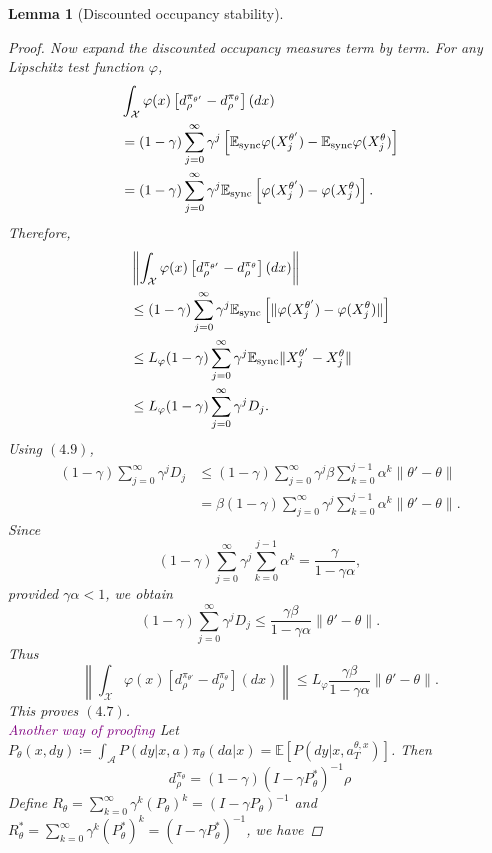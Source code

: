 \documentclass{article}
\newtheorem{lem}[thm]{Lemma}
\theoremstyle{definition}
\theoremstyle{remark}
\theoremstyle{mystyle}
\newcommand{\E}{\mathbb{E}}
\newcommand{\1}{\mathbbm{1}}
\begin{document}
\begin{lem}[Discounted occupancy stability]
\begin{proof}
Now expand the discounted occupancy measures term by term. For any Lipschitz test function \(\varphi\),
\[
\begin{aligned}
&\int_{\mathcal X}\varphi(x)
\left[
d_\rho^{\pi_{\theta'}}-d_\rho^{\pi_\theta}
\right](dx)
\\
&=
(1-\gamma)
\sum_{j=0}^{\infty}
\gamma^j
\left[
\mathbb E_{\rm sync}\varphi(X_j^{\theta'})
-
\mathbb E_{\rm sync}\varphi(X_j^\theta)
\right]
\\
&=
(1-\gamma)
\sum_{j=0}^{\infty}
\gamma^j
\mathbb E_{\rm sync}
\left[
\varphi(X_j^{\theta'})
-
\varphi(X_j^\theta)
\right].
\end{aligned}
\]
Therefore,
\[
\begin{aligned}
&\left\|
\int_{\mathcal X}\varphi(x)
\left[
d_\rho^{\pi_{\theta'}}-d_\rho^{\pi_\theta}
\right](dx)
\right\|
\\
&\le
(1-\gamma)
\sum_{j=0}^{\infty}
\gamma^j
\mathbb E_{\rm sync}
\left[
\|\varphi(X_j^{\theta'})
-
\varphi(X_j^\theta)\|
\right]
\\
&\le
L_\varphi
(1-\gamma)
\sum_{j=0}^{\infty}
\gamma^j
\mathbb E_{\rm sync}
\|X_j^{\theta'}-X_j^\theta\|
\\
&\le
L_\varphi
(1-\gamma)
\sum_{j=0}^{\infty}
\gamma^jD_j.
\end{aligned}
\]
Using \((4.9)\),
\[
\begin{aligned}
(1-\gamma)
\sum_{j=0}^{\infty}
\gamma^jD_j
&\le
(1-\gamma)
\sum_{j=0}^{\infty}
\gamma^j
\beta
\sum_{k=0}^{j-1}\alpha^k
\|\theta'-\theta\|
\\
&=
\beta
(1-\gamma)
\sum_{j=0}^{\infty}
\gamma^j
\sum_{k=0}^{j-1}\alpha^k
\|\theta'-\theta\|.
\end{aligned}
\]
Since
\[
(1-\gamma)
\sum_{j=0}^{\infty}
\gamma^j
\sum_{k=0}^{j-1}\alpha^k
=
\frac{\gamma}{1-\gamma\alpha},
\]
provided \(\gamma\alpha<1\), we obtain
\[
(1-\gamma)
\sum_{j=0}^{\infty}
\gamma^jD_j
\le
\frac{\gamma\beta}{1-\gamma\alpha}
\|\theta'-\theta\|.
\]
Thus
\[
\left\|
\int_{\mathcal X}\varphi(x)
\left[
d_\rho^{\pi_{\theta'}}-d_\rho^{\pi_\theta}
\right](dx)
\right\|
\le
L_\varphi
\frac{\gamma\beta}{1-\gamma\alpha}
\|\theta'-\theta\|.
\]
This proves \((4.7)\).\\
\textcolor{purple}{Another way of proofing}
Let $P_\theta(x,dy) \coloneqq \int_\mathcal{A} P(dy|x,a)\pi_\theta(da|x) = \E[P(dy|x,a^{\theta,x}_T)]$. Then 
\[d^{\pi_\theta}_\rho=(1-\gamma)(I-\gamma P^*_\theta)^{-1}\rho\]
Define $R_\theta=\sum_{k=0}^\infty\gamma^k (P_\theta)^k=(I-\gamma P_\theta)^{-1}$ and $R^*_\theta=\sum_{k=0}^\infty\gamma^k (P^*_\theta)^k=(I-\gamma P^*_\theta)^{-1}$, we have 

\end{proof}
\end{lem}
\end{document}

